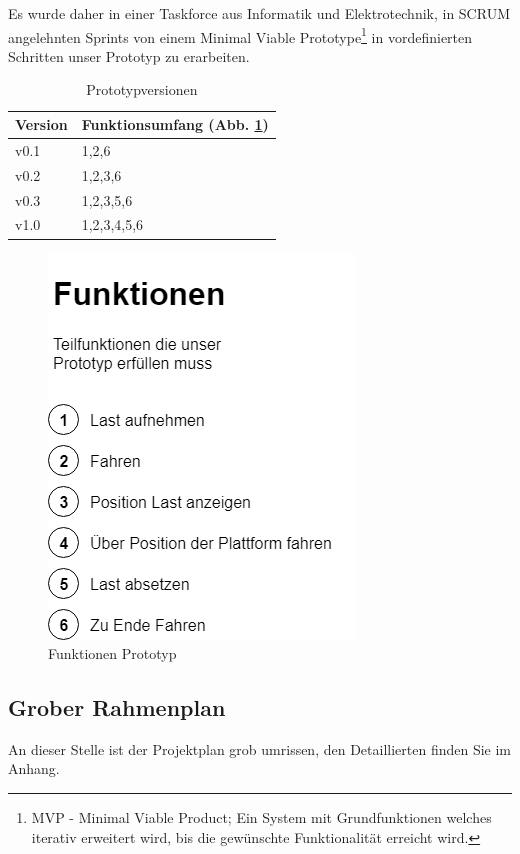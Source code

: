 \documentclass[a4paper]{report}
\begin{document}
Es wurde daher in einer Taskforce aus Informatik und Elektrotechnik, in SCRUM angelehnten Sprints von einem Minimal Viable Prototype\footnote{MVP - Minimal Viable Product; Ein System mit Grundfunktionen welches iterativ erweitert wird, bis die gewünschte Funktionalität erreicht wird.} in vordefinierten Schritten unser Prototyp zu erarbeiten.

\vspace{1em}
\noindent
\begin{table}[h]
	\centering
	\begin{tabular}{|p{}|p{}|}
		\hline
		\textbf{Version} & \textbf{Funktionsumfang (Abb. \ref{fig:PrototypePlanung})} \\
		\hline
		 v0.1 & 1,2,6\\
		\hline
		 v0.2 & 1,2,3,6\\
		\hline
		 v0.3 & 1,2,3,5,6\\
		\hline
		 v1.0 & 1,2,3,4,5,6\\
		\hline
	\end{tabular}
	\caption{Prototypversionen}
	\label{tab:PrototypePlanung}
\end{table}

\begin{figure}[h!]
	\centering
	\includegraphics[width=0.5\linewidth,keepaspectratio]{PrototypePlanung}
	\caption{Funktionen Prototyp}
	\label{fig:PrototypePlanung}
\end{figure}

\subsection{Grober Rahmenplan}
\label{ssec:GrobRahmenplan}
An dieser Stelle ist der Projektplan grob umrissen, den Detaillierten finden Sie im Anhang.
\end{document}
